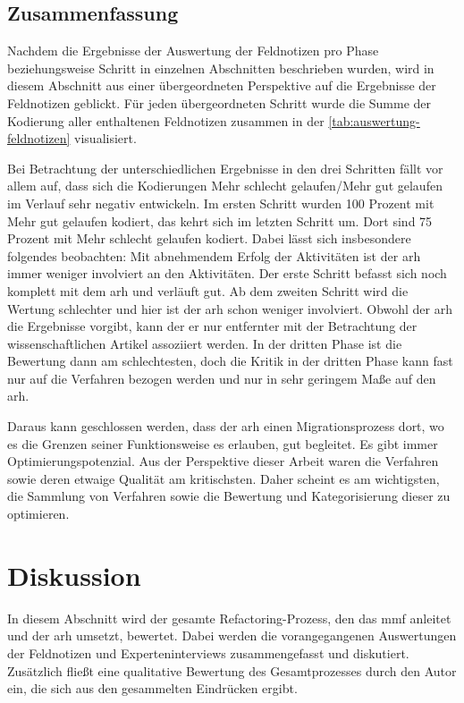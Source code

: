 \subsection{Zusammenfassung}

Nachdem die Ergebnisse der Auswertung der Feldnotizen pro Phase beziehungsweise Schritt in einzelnen Abschnitten beschrieben wurden, wird in diesem Abschnitt aus einer übergeordneten Perspektive auf die Ergebnisse der Feldnotizen geblickt.
Für jeden übergeordneten Schritt wurde die Summe der Kodierung aller enthaltenen Feldnotizen zusammen in der \cref{tab:auswertung-feldnotizen} visualisiert.


Bei Betrachtung der unterschiedlichen Ergebnisse in den drei Schritten fällt vor allem auf, dass sich die Kodierungen \glqq Mehr schlecht gelaufen\grqq{}/\glqq Mehr gut gelaufen\grqq{} im Verlauf sehr negativ entwickeln.
Im ersten Schritt wurden 100 Prozent mit \glqq Mehr gut gelaufen\grqq{} kodiert, das kehrt sich im letzten Schritt um.
Dort sind 75 Prozent mit \glqq Mehr schlecht gelaufen\grqq{} kodiert.
Dabei lässt sich insbesondere folgendes beobachten: Mit abnehmendem Erfolg der Aktivitäten ist der \gls{arh} immer weniger involviert an den Aktivitäten.
Der erste Schritt befasst sich noch komplett mit dem \gls{arh} und verläuft gut.
Ab dem zweiten Schritt wird die Wertung schlechter und hier ist der \gls{arh} schon weniger involviert.
Obwohl der \gls{arh} die Ergebnisse vorgibt, kann der er nur entfernter mit der Betrachtung der wissenschaftlichen Artikel assoziiert werden.
In der dritten Phase ist die Bewertung dann am schlechtesten, doch die Kritik in der dritten Phase kann fast nur auf die Verfahren bezogen werden und nur in sehr geringem Maße auf den \gls{arh}.

Daraus kann geschlossen werden, dass der \gls{arh} einen Migrationsprozess dort, wo es die Grenzen seiner Funktionsweise es erlauben, gut begleitet.
Es gibt immer Optimierungspotenzial.
Aus der Perspektive dieser Arbeit waren die Verfahren sowie deren etwaige Qualität am kritischsten.
Daher scheint es am wichtigsten, die Sammlung von Verfahren sowie die Bewertung und Kategorisierung dieser zu optimieren.

\section{Diskussion}
\label{sec:auswertung-diskussion}

In diesem Abschnitt wird der gesamte Refactoring-Prozess, den das \gls{mmf} anleitet und der \gls{arh} umsetzt, bewertet.
Dabei werden die vorangegangenen Auswertungen der Feldnotizen und Experteninterviews zusammengefasst und diskutiert.
Zusätzlich fließt eine qualitative Bewertung des Gesamtprozesses durch den Autor ein, die sich aus den gesammelten Eindrücken ergibt.

